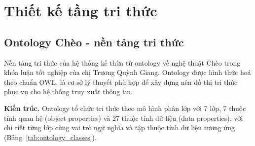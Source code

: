 
\section{Thiết kế tầng tri thức}
\label{sec:knowledge_design}

\subsection{Ontology Chèo - nền tảng tri thức}
\label{sec:ontology_cheo}

Nền tảng tri thức của hệ thống kế thừa từ ontology về nghệ thuật Chèo trong khóa luận tốt nghiệp của chị Trương Quỳnh Giang. Ontology được hình thức hoá theo chuẩn OWL, là cơ sở lý thuyết phù hợp để xây dựng nên đồ thị tri thức phục vụ cho hệ thống truy xuất thông tin.

\textbf{Kiến trúc.}
Ontology tổ chức tri thức theo mô hình phân lớp với 7 lớp, 7 thuộc tính quan hệ (object properties) và 27 thuộc tính dữ liệu (data properties), với chi tiết từng lớp cùng vai trò ngữ nghĩa và tập thuộc tính dữ liệu tương ứng (Bảng~\ref{tab:ontology_classes}).

